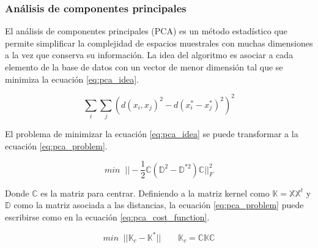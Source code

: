 \subsubsection{Análisis de componentes principales}

El análisis de componentes principales (PCA) es un método estadístico que permite simplificar la complejidad de espacios muestrales con muchas dimensiones a la vez que conserva su información. La idea del algoritmo es asociar a cada elemento de la base de datos con un vector de menor dimensión tal que se minimiza la ecuación \ref{eq:pca_idea}.

\begin{equation}
    \sum_i \sum_j (d(x_i,x_j)^2-d(x^*_i-x_j^*)^2)^2
    \label{eq:pca_idea}
\end{equation}

El problema de minimizar la ecuación \ref*{eq:pca_idea} se puede transformar a la ecuación \ref{eq:pca_problem}.

\begin{equation}
    min\;\; ||-\frac{1}{2}\mathbb{C}(\mathbb{D}^2-\mathbb{D}^{*2})\mathbb{C}||_F^2
    \label{eq:pca_problem}
\end{equation}

Donde $\mathbb{C}$ es la matriz para centrar. Definiendo a la matriz kernel como $\mathbb{K}=\mathbb{X}\mathbb{X}^t$ y $\mathbb{D}$ como la matriz asociada a las distancias, la ecuación \ref{eq:pca_problem} puede escribirse como en la ecuación \ref{eq:pca_cost_function}.

\begin{equation}
    min\;\; ||\mathbb{K}_c-\mathbb{K}^*|| \qquad \mathbb{K}_c = \mathbb{C}\mathbb{K}\mathbb{C}
    \label{eq:pca_cost_function}
\end{equation}